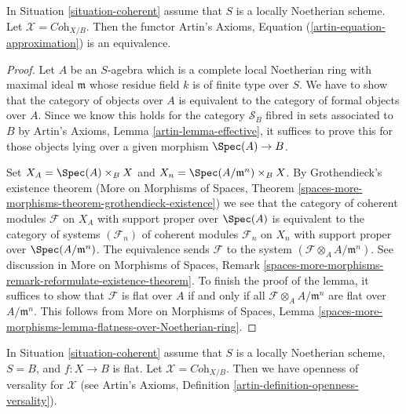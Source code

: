 \begin{lemma}
\label{lemma-coherent-existence}
In Situation \ref{situation-coherent} assume that $S$ is a locally Noetherian
scheme. Let $\mathcal{X} = \textit{Coh}_{X/B}$. Then the functor
Artin's Axioms, Equation (\ref{artin-equation-approximation})
is an equivalence.
\end{lemma}

\begin{proof}
Let $A$ be an $S$-agebra which is a complete local Noetherian ring
with maximal ideal $\mathfrak m$
whose residue field $k$ is of finite type over $S$.
We have to show that the category of objects over $A$ is
equivalent to the category of formal objects over $A$.
Since we know this holds for the category $\mathcal{S}_B$
fibred in sets associated to $B$ by Artin's Axioms, 
Lemma \ref{artin-lemma-effective}, it suffices to prove this
for those objects lying over a given morphism $\Spec(A) \to B$.

\medskip\noindent
Set $X_A = \Spec(A) \times_B X$ and $X_n = \Spec(A/\mathfrak m^n) \times_B X$.
By Grothendieck's existence theorem
(More on Morphisms of Spaces, Theorem
\ref{spaces-more-morphisms-theorem-grothendieck-existence})
we see that the category of coherent modules $\mathcal{F}$
on $X_A$ with support proper over $\Spec(A)$ is equivalent
to the category of systems $(\mathcal{F}_n)$ of coherent modules
$\mathcal{F}_n$ on $X_n$ with support proper over
$\Spec(A/\mathfrak m^n)$. The equivalence sends $\mathcal{F}$
to the system $(\mathcal{F} \otimes_A A/\mathfrak m^n)$. See discussion in
More on Morphisms of Spaces, Remark
\ref{spaces-more-morphisms-remark-reformulate-existence-theorem}.
To finish the proof of the lemma, it suffices to show that
$\mathcal{F}$ is flat over $A$ if and only if all
$\mathcal{F} \otimes_A A/\mathfrak m^n$ are flat over $A/\mathfrak m^n$.
This follows from
More on Morphisms of Spaces, Lemma
\ref{spaces-more-morphisms-lemma-flatness-over-Noetherian-ring}.
\end{proof}

\begin{lemma}
\label{lemma-coherent-defo-thy}
In Situation \ref{situation-coherent} assume that
$S$ is a locally Noetherian scheme, $S = B$, and $f : X \to B$ is flat.
Let $\mathcal{X} = \textit{Coh}_{X/B}$. Then we have openness of
versality for $\mathcal{X}$ (see
Artin's Axioms, Definition \ref{artin-definition-openness-versality}).
\end{lemma}

